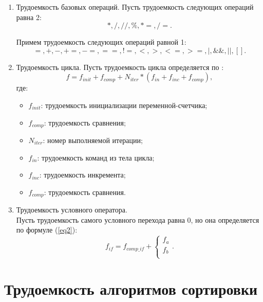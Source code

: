 \begin{enumerate}
	\item Трудоемкость базовых операций.
	Пусть трудоемкость следующих операций равна 2: 
	$$*, /, //, \%, *=, /=. $$
	
	Примем трудоемкость следующих операций равной 1:
	$$=, +, -, +=, -=, ==, !=, <, >, <=, >=, |, \&\&, ||, [].$$  
	\item Трудоемкость цикла.
	Пусть трудоемкость цикла определяется по :
	\begin{equation}
		\label{eq1} 
		f = f_{init} + f_{comp} + N_{iter} * (f_{in} + f_{inc} + f_{comp}),
	\end{equation} 
	где:
	\begin{itemize}
		\item $f_{init}$: трудоемкость инициализации переменной-счетчика;
		\item $f_{comp}$: трудоемкость сравнения;
		\item $N_{iter}$: номер выполняемой итерации;
		\item $f_{in}$: трудоемкость команд из тела цикла;
		\item $f_{inc}$: трудоемкость инкремента;
		\item $f_{comp}$: трудоемкость сравнения.
	\end{itemize}
	\item Трудоемкость условного оператора. \\
	Пусть трудоемкость самого условного перехода равна 0, но она определяется по формуле (\ref{eq2}): 
	\begin{equation}
		\label{eq2}
		f_{if} = f_{comp\_if} + \begin{cases}
			f_{a}\\
			f_{b}\\
		\end{cases}.
	\end{equation}
\end{enumerate}

\section{Трудоемкость алгоритмов сортировки}
